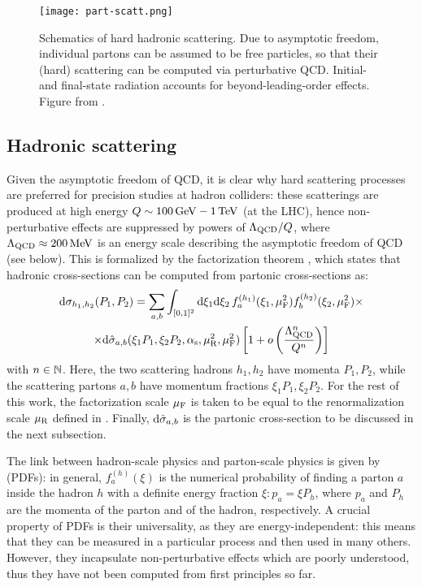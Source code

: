\begin{figure}
  \centering
  \texttt{[image: part-scatt.png]}
  \caption{Schematics of hard hadronic scattering. Due to asymptotic freedom, individual partons can be assumed to be free particles, so that their (hard) scattering can be computed via perturbative QCD. Initial- and final-state radiation accounts for beyond-leading-order effects. Figure from \cite{Asteriadis-2020}.}
  \label{fig:part-scatt}
\end{figure}

\subsection{Hadronic scattering}

Given the asymptotic freedom of QCD, it is clear why hard scattering processes are preferred for precision studies at hadron colliders: these scatterings are produced at high energy $ Q \sim 100\,\mathrm{GeV} - 1\,\mathrm{TeV} $ (at the LHC), hence non-perturbative effects are suppressed by powers of $ \Lambda_\text{QCD} / Q $, where $ \Lambda_\text{QCD} \approx 200\,\mathrm{MeV} $ is an energy scale describing the asymptotic freedom of QCD (see below). This is formalized by the factorization theorem \cite{Collins-1989}, which states that hadronic cross-sections can be computed from partonic cross-sections as:
\begin{multline}
  \mathrm{d}\sigma_{h_1,h_2}(P_1 , P_2) = \sum_{a,b} \int_{[0,1]^2} \mathrm{d} \xi_1 \mathrm{d} \xi_2 \, f_a^{(h_1)}(\xi_1, \mu_\text{F}^2) f_b^{(h_2)}(\xi_2, \mu_\text{F}^2) \times \\
  \times \mathrm{d}\hat{\sigma}_{a,b}(\xi_1 P_1, \xi_2 P_2, \alpha_\text{s}, \mu_\text{R}^2, \mu_\text{F}^2)
  \left[ 1 + o \left( \frac{\Lambda_\text{QCD}^n}{Q^n} \right) \right]
  \label{eq:fact-th}
\end{multline}
with $ n \in \mathbb{N} $. Here, the two scattering hadrons $ h_1 , h_2 $ have momenta $ P_1 , P_2 $, while the scattering partons $ a , b $ have momentum fractions $ \xi_1 P_1 , \xi_2 P_2 $. For the rest of this work, the factorization scale $ \mu_\text{F} $ is taken to be equal to the renormalization scale $ \mu_\text{R} $ defined in . Finally, $ \mathrm{d}\hat{\sigma}_{a,b} $ is the partonic cross-section to be discussed in the next subsection.

The link between hadron-scale physics and parton-scale physics is given by  (PDFs): in general, $ f_a^{(h)}(\xi) $ is the numerical probability of finding a parton $ a $ inside the hadron $ h $ with a definite energy fraction $ \xi : p_a = \xi P_h $, where $ p_a $ and $ P_h $ are the momenta of the parton and of the hadron, respectively. A crucial property of PDFs is their universality, as they are energy-independent: this means that they can be measured in a particular process and then used in many others. However, they incapsulate non-perturbative effects which are poorly understood, thus they have not been computed from first principles so far.

